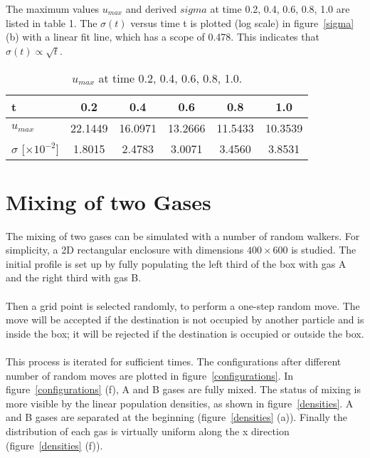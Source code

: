 \documentclass{article}
\begin{document}
The maximum values $u_{max}$ and derived $sigma$ at time 0.2, 0.4, 0.6, 0.8, 1.0 are listed in table 1. The $\sigma (t)$ versus time t is plotted (log scale) in figure~\ref{sigma} (b) with a linear fit line, which has a scope of 0.478. This indicates that $\sigma(t) \propto \sqrt{t}$.\\

\begin{table}[!ht]
\begin{center}
\caption{$u_{max}$ at time 0.2, 0.4, 0.6, 0.8, 1.0.}
\begin{tabular}{ l | c | c | c | c | c }
\hline
t & 0.2 & 0.4 & 0.6 & 0.8 & 1.0 \\ \hline
$u_{max}$ & 22.1449 & 16.0971 & 13.2666 & 11.5433 & 10.3539 \\ \hline
$\sigma$ [$\times 10^{-2}$] & 1.8015 & 2.4783 & 3.0071 & 3.4560 & 3.8531 \\ \hline
\end{tabular}
\end{center}
\label{umax}
\end{table}

\section{Mixing of two Gases}
The mixing of two gases can be simulated with a number of random walkers. For simplicity, a 2D rectangular enclosure with dimensions $400 \times 600$ is studied. The initial profile is set up by fully populating the left third of the box with gas A and the right third with gas B.\\
\\
Then a grid point is selected randomly, to perform a one-step random move. The move will be accepted if the destination is not occupied by another particle and is inside the box; it will be rejected if the destination is occupied or outside the box.\\
\\
This process is iterated for sufficient times. The configurations after different number of random moves are plotted in figure~\ref{configurations}. In figure~\ref{configurations} (f), A and B gases are fully mixed. The status of mixing is more visible by the linear population densities, as shown in figure~\ref{densities}. A and B gases are separated at the beginning (figure~\ref{densities} (a)). Finally the distribution of each gas is virtually uniform along the x direction (figure~\ref{densities} (f)).\\
\end{document}
